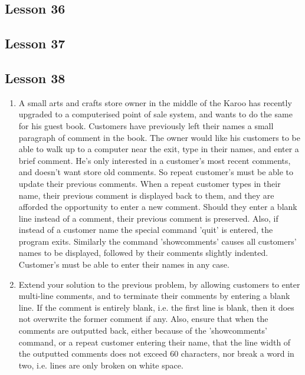 \subsection{Lesson 36}


\subsection{Lesson 37}


\subsection{Lesson 38}

\begin{enumerate}
	\item A small arts and crafts store owner in the middle of the Karoo    has recently upgraded to a computerised point of sale system, and    wants to do the same for his guest book. Customers have previously    left their names a small paragraph of comment in the book. The owner    would like his customers to be able to walk up to a computer near    the exit, type in their names, and enter a brief comment. He's only    interested in a customer's most recent comments, and doesn't want    store old comments. So repeat customer's must be able to update    their previous comments. When a repeat customer types in their name,    their previous comment is displayed back to them, and they are    afforded the opportunity to enter a new comment. Should they enter a    blank line instead of a comment, their previous comment is    preserved. Also, if instead of a customer name the special command    'quit' is entered, the program exits. Similarly the command    'showcomments' causes all customers' names to be displayed, followed    by their comments slightly indented. Customer's must be able to    enter their names in any case.
	\item Extend your solution to the previous problem, by allowing    customers to enter multi-line comments, and to terminate their    comments by entering a blank line. If the comment is entirely blank,    i.e. the first line is blank, then it does not overwrite the former    comment if any. Also, ensure that when the comments are outputted    back, either because of the 'showcomments' command, or a repeat    customer entering their name, that the line width of the outputted    comments does not exceed 60 characters, nor break a word in two,    i.e. lines are only broken on white space.
\end{enumerate}

